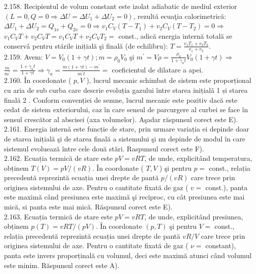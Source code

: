 \documentclass[10pt]{article}
\begin{document}
2.158. Recipientul de volum constant este izolat adiabatic de mediul exterior $\left(L=0, Q=0 \Rightarrow \Delta U=\Delta U_{1}+\Delta U_{2}=0\right)$, rezultă ecuaţia calorimetrică:\\
$\Delta U_{1}+\Delta U_{2}=Q_{1 v}+Q_{2 v}=0 \Rightarrow v_{1} C_{V}\left(T-T_{1}\right)+v_{2} C_{V}\left(T-T_{2}\right)=0 \Rightarrow$\\
$v_{1} C_{V} T+v_{2} C_{V} T=v_{1} C_{V} T+v_{2} C_{V} T_{2}=$ const., adică energia internă totală se conservǎ pentru stările inițială şi finală (de echilibru): $T=\frac{v_{1} T_{1}+v_{2} T_{2}}{v_{1}+v_{2}}$.\\
2.159. Avem: $V=V_{0}(1+\gamma t) ; m=\rho_{0} V_{0}$ şi $m^{\prime}=V \rho=\frac{\rho_{0}}{1+\gamma_{a} t} V_{0}(1+\gamma t) \Rightarrow$ $\frac{m}{m^{\prime}}=\frac{1+\gamma_{a} t}{1+\gamma t} \Rightarrow \gamma_{a}=\frac{m(1+\gamma t)-m^{\prime}}{m^{\prime} t}=$ coeficientul de dilatare a apei.\\
2.160. În coordonate ( $p, V$ ), lucrul mecanic schimbat de sistem este proporțional cu aria de sub curba care descrie evoluția gazului între starea inițialã 1 și starea finală 2 . Conform convenției de semne, lucrul mecanic este pozitiv dacă este cedat de sistem exteriorului, caz în care sensul de parcurgere al curbei se face în sensul crescător al abscisei (axa volumelor). Aşadar răspunsul corect este E).\\
2.161. Energia internă este funcție de stare, prin urmare variația ei depinde doar de starea inițială şi de starea finală a sistemului şi nu depinde de modul în care sistemul evoluează între cele două stări. Raspunsul corect este F).\\
2.162. Ecuația termică de stare este $p V=v R T$, de unde, explicitând temperatura, obținem $T(V)=p V /(v R)$. În coordonate ( $T, V$ ) şi pentru $p=$ const., relația precedentă reprezintă ecuația unei drepte de pantă $p /(v R)$ care trece prin originea sistemului de axe. Pentru o cantitate fixată de gaz ( $v=$ const.), panta este maximă când presiunea este maximă şi reciproc, cu cât presiunea este mai mică, si panta este mai mică. Răspunsul corect este E).\\
2.163. Ecuația termică de stare este $p V=v R T$, de unde, explicitând presiunea, obținem $p(T)=v R T /(p V)$. În coordonate $(p, T)$ şi pentru $V=$ const., relația precedentă reprezintă ecuația unei drepte de pantă $v R / V$ care trece prin originea sistemului de axe. Pentru o cantitate fixată de gaz ( $\nu=$ constant), panta este invers proporținală cu volumul, deci este maximă atunci când volumul este minim. Răspunsul corect este A).\\
\end{document}
